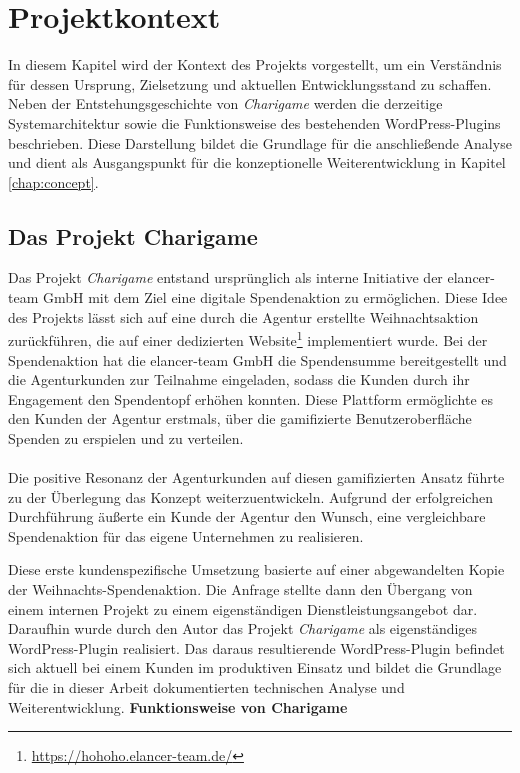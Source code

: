 \chapter{Projektkontext}
\label{chap:context}
In diesem Kapitel wird der Kontext des Projekts vorgestellt, um ein Verständnis für dessen Ursprung, Zielsetzung und aktuellen Entwicklungsstand zu schaffen.
Neben der Entstehungsgeschichte von \textit{Charigame} werden die derzeitige Systemarchitektur sowie die Funktionsweise des bestehenden WordPress-Plugins beschrieben.
Diese Darstellung bildet die Grundlage für die anschließende Analyse und dient als Ausgangspunkt für die konzeptionelle Weiterentwicklung in Kapitel \ref{chap:concept}.
\section{Das Projekt Charigame}

Das Projekt \textit{Charigame} entstand ursprünglich als interne Initiative der elancer-team GmbH mit dem Ziel eine digitale Spendenaktion zu ermöglichen.
Diese Idee des Projekts lässt sich auf eine durch die Agentur erstellte Weihnachtsaktion zurückführen, die auf einer dedizierten Website\footnote{\url{https://hohoho.elancer-team.de/}} implementiert wurde.
Bei der Spendenaktion hat die elancer-team GmbH die Spendensumme bereitgestellt und die Agenturkunden zur Teilnahme eingeladen, sodass die Kunden durch ihr Engagement den Spendentopf erhöhen konnten.
Diese Plattform ermöglichte es den Kunden der Agentur erstmals, über die gamifizierte Benutzeroberfläche Spenden zu erspielen und zu verteilen.
\\\\
Die positive Resonanz der Agenturkunden auf diesen gamifizierten Ansatz führte zu der Überlegung das Konzept weiterzuentwickeln.
Aufgrund der erfolgreichen Durchführung äußerte ein Kunde der Agentur den Wunsch, eine vergleichbare Spendenaktion für das eigene Unternehmen zu realisieren.

Diese erste kundenspezifische Umsetzung basierte auf einer abgewandelten Kopie der Weihnachts-Spendenaktion.
Die Anfrage stellte dann den Übergang von einem internen Projekt zu einem eigenständigen Dienstleistungsangebot dar.
Daraufhin wurde durch den Autor das Projekt \textit{Charigame} als eigenständiges WordPress-Plugin realisiert.
Das daraus resultierende WordPress-Plugin befindet sich aktuell bei einem Kunden im produktiven Einsatz und bildet die Grundlage für die in dieser Arbeit dokumentierten technischen Analyse und Weiterentwicklung.
\newpage
\textbf{Funktionsweise von Charigame}

